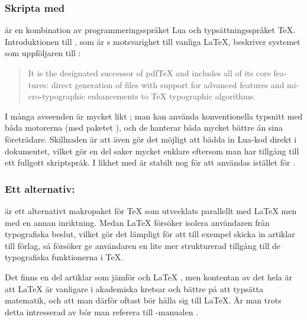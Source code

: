 \documentclass[lang=sv,ptsize=10pt,font=none,nomath,titles=bf,../../a4.tex]{subfiles}
\begin{document}
\subsubsection{Skripta med }
 är en kombination av programmeringsspråket Lua och
typsättningsspråket \TeX. Introduktionen till ,
som är s motsvarighet till vanliga \LaTeX,
beskriver systemet som uppföljaren till \pdfLaTeX:
\begin{quote}
	\begin{english}
		It is the designated successor of pdf\TeX{} and includes all of 
		its core features: direct generation of \PDF files with support 
		for advanced \PDF features and micro-typographic enhancements to 
		\TeX{} typographic algorithms.

		\nopagebreak
		\hfill\textcite{Gonnard10}\hspace{-1ex}%
	\end{english}
\end{quote}

I många avseenden är  mycket likt \XeTeX; man kan använda
konventionella typsnitt med båda motorerna (med paketet ), 
och de hanterar båda \UTF 
mycket bättre än sina företrädare. Skillnaden är att 
även gör det möjligt att bädda in Lua-kod direkt i dokumentet, vilket gör
en del saker mycket enklare eftersom man har tillgång till ett fullgott
skriptspråk. I likhet med \XeTeX är  stabilt nog för att
användas istället för \pdfLaTeX.

\subsubsection{Ett alternativ: }
 är ett alternativt makropaket för \TeX{} som utvecklats
parallellt med \LaTeX{} men med en annan inriktning. Medan \LaTeX{}
försöker isolera användaren från typografiska beslut, vilket gör det
lämpligt för att till exempel skicka in artiklar till förlag, så
försöker  ge användaren en lite mer strukturerad tillgång
till de typografiska funktionerna i \TeX.

Det finns en del artiklar som jämför  och \LaTeX{}
\parencite[till exempel][]{Hoekwater98}, men kontentan av det hela är att
\LaTeX{} är vanligare i akademiska kretsar och bättre på att typsätta
matematik, och att man därför oftast bör hålla sig till \LaTeX. Är man
trots detta intresserad av  bör man referera till
-manualen \parencite{Hagen01}.
\end{document}
